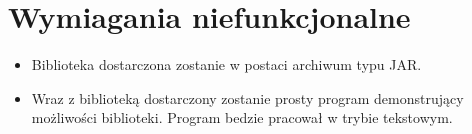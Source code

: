 \documentclass{article}
\begin{document}
\section{Wymiagania niefunkcjonalne}
\begin{itemize}
	\item Biblioteka dostarczona zostanie w postaci archiwum typu JAR.
	\item Wraz z biblioteką dostarczony zostanie prosty program demonstrujący możliwości biblioteki.
	Program bedzie pracował w trybie tekstowym.
\end{itemize}
\end{document}
